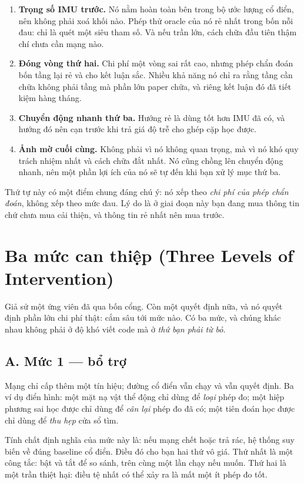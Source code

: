 \documentclass[../../deep_learning.tex]{subfiles}
\begin{document}
\begin{enumerate}
\item \textbf{Trọng số IMU trước.} Nó nằm hoàn toàn bên trong bộ ước lượng cổ điển, nên không phải xoá khối nào. Phép thử oracle của nó rẻ nhất trong bốn nỗi đau: chỉ là quét một siêu tham số. Và nếu trần lớn, cách chữa đầu tiên thậm chí chưa cần mạng nào.
\item \textbf{Đóng vòng thứ hai.} Chi phí một vòng sai rất cao, nhưng phép chẩn đoán bốn tầng lại rẻ và cho kết luận sắc. Nhiều khả năng nó chỉ ra rằng tầng cần chữa không phải tầng mà phần lớn paper chữa, và riêng kết luận đó đã tiết kiệm hàng tháng.
\item \textbf{Chuyển động nhanh thứ ba.} Hướng rẻ là dùng tốt hơn IMU đã có, và hướng đó nên cạn trước khi trả giá độ trễ cho ghép cặp học được.
\item \textbf{Ảnh mờ cuối cùng.} Không phải vì nó không quan trọng, mà vì nó khó quy trách nhiệm nhất và cách chữa đắt nhất. Nó cũng chồng lên chuyển động nhanh, nên một phần lợi ích của nó sẽ tự đến khi bạn xử lý mục thứ ba.
\end{enumerate}

Thứ tự này có một điểm chung đáng chú ý: nó xếp theo \emph{chi phí của phép chẩn đoán}, không xếp theo mức đau. Lý do là ở giai đoạn này bạn đang mua thông tin chứ chưa mua cải thiện, và thông tin rẻ nhất nên mua trước.

\section{Ba mức can thiệp (Three Levels of Intervention)}
Giả sử một ứng viên đã qua bốn cổng. Còn một quyết định nữa, và nó quyết định phần lớn chi phí thật: cắm sâu tới mức nào. Có ba mức, và chúng khác nhau không phải ở độ khó viết code mà ở \emph{thứ bạn phải từ bỏ}.

\subsection{A. Mức 1 --- bổ trợ}
Mạng chỉ cấp thêm một tín hiệu; đường cổ điển vẫn chạy và vẫn quyết định. Ba ví dụ điển hình: một mặt nạ vật thể động chỉ dùng để \emph{loại} phép đo; một hiệp phương sai học được chỉ dùng để \emph{cân lại} phép đo đã có; một tiên đoán học được chỉ dùng để \emph{thu hẹp} cửa sổ tìm.

Tính chất định nghĩa của mức này là: nếu mạng chết hoặc trả rác, hệ thống suy biến về đúng baseline cổ điển. Điều đó cho bạn hai thứ vô giá. Thứ nhất là một công tắc: bật và tắt để so sánh, trên cùng một lần chạy nếu muốn. Thứ hai là một trần thiệt hại: điều tệ nhất có thể xảy ra là mất một ít phép đo tốt.
\end{document}
